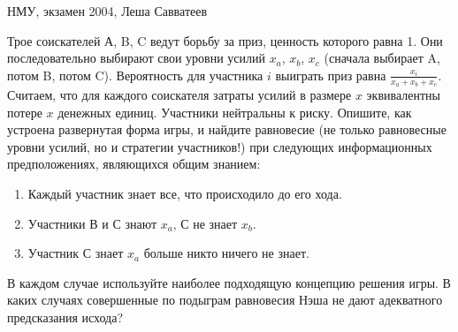 \begin{problem}\begin{source}
НМУ, экзамен 2004, Леша Савватеев
\end{source}
 Трое соискателей А, B, C ведут борьбу за приз, ценность которого равна 1. Они последовательно выбирают свои уровни усилий $x_{a}$, $x_{b}$, $x_{c}$ (сначала выбирает A, потом B, потом C). Вероятность для участника $i$ выиграть приз равна $\frac{x_{i}}{x_{a}+x_{b}+x_{c}}$. Считаем, что для каждого соискателя затраты усилий в размере $x$ эквивалентны потере $x$ денежных единиц. Участники нейтральны к риску.
Опишите, как устроена развернутая форма игры, и найдите равновесие (не только равновесные уровни усилий, но и стратегии участников!) при следующих информационных предположениях, являющихся общим знанием:
\begin{enumerate}
\item Каждый участник знает все, что происходило до его хода.
\item Участники В и С знают $x_{a}$, С не знает $x_{b}$.
\item Участник С знает $x_{a}$ больше никто ничего не знает.
\end{enumerate}
В каждом случае используйте наиболее подходящую концепцию решения игры. В каких случаях совершенные по подыграм равновесия Нэша не дают адекватного предсказания исхода?


\begin{sol}

\end{sol}
\end{problem}





